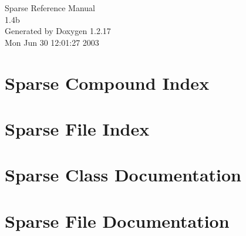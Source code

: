\documentclass[a4paper]{book}
\begin{document}
\begin{titlepage}
\vspace*{7cm}
\begin{center}
{\Large Sparse Reference Manual\\[1ex]\large 1.4b}\\
\vspace*{1cm}
{\large Generated by Doxygen 1.2.17}\\
\vspace*{0.5cm}
{\small Mon Jun 30 12:01:27 2003}\\
\end{center}
\end{titlepage}
\clearemptydoublepage
{}
\tableofcontents
\clearemptydoublepage
{}
\chapter{Sparse Compound Index}

\chapter{Sparse File Index}

\chapter{Sparse Class Documentation}

\chapter{Sparse File Documentation}









\printindex
\end{document}
